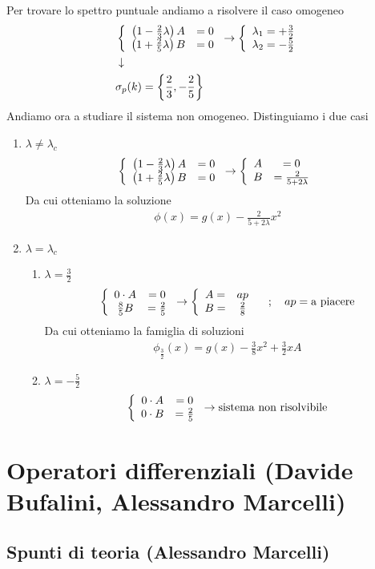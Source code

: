 Per trovare lo spettro puntuale andiamo a risolvere il caso omogeneo
\begin{align}
	&\left\{ \begin{array}{cc} \left( 1 - \frac{2}{3}\lambda \right) A &=0\\ \left( 1 + \frac{2}{5}\lambda \right) B &= 0 \end{array} \right. \to \left\{ \begin{array}{cc} \lambda_1 = +\frac{3}{2}\\ \lambda_2 = -\frac{5}{2} \end{array} \right. \\ &\downarrow \nonumber \\
	&\sigma_p(k) = \left\{ \frac{2}{3} , -\frac{2}{5} \right\}
\end{align}
Andiamo ora a studiare il sistema non omogeneo. Distinguiamo i due casi
\begin{enumerate}
	\item $\lambda \neq \lambda_c$
	\begin{align}
		\left\{ \begin{array}{cc} \left( 1 - \frac{2}{3}\lambda \right) A &=0\\ \left( 1 + \frac{2}{5}\lambda \right) B &= 0 \end{array} \right. \to \left\{ \begin{array}{cc} A &=0\\ B &= \frac{2}{5+2\lambda} \end{array} \right.
	\end{align}
	Da cui otteniamo la soluzione
	\begin{align}
		\phi(x) = g(x) - \frac{2}{5+2\lambda} x^2
	\end{align}
	\newpage
	\item $\lambda = \lambda_c$
	\begin{enumerate}
		\item $\lambda=\frac{3}{2}$
		\begin{align}
			\left\{ \begin{array}{cc} 0\cdot A &=0\\ \frac{8}{5} B &= \frac{2}{5} \end{array} \right. \to \left\{ \begin{array}{cc} A = &ap\\ B = &\frac{2}{8} \end{array} \right. \quad ; \quad ap = \text{a piacere}
		\end{align}
		Da cui otteniamo la famiglia di soluzioni
		\begin{align}
			\phi_{\frac{3}{2}}(x) = g(x) - \frac{3}{8} x^2 + \frac{3}{2}xA 
		\end{align}
		\item $\lambda=-\frac{5}{2}$
		\begin{align}
			\left\{ \begin{array}{cc} 0\cdot A &=0\\ 0\cdot B &= \frac{2}{5} \end{array} \right. \to \text{sistema non risolvibile}
		\end{align}
	
	\end{enumerate}
\end{enumerate}

\newpage

\section{Operatori differenziali (Davide Bufalini, Alessandro Marcelli)}

\subsection{Spunti di teoria (Alessandro Marcelli)}

